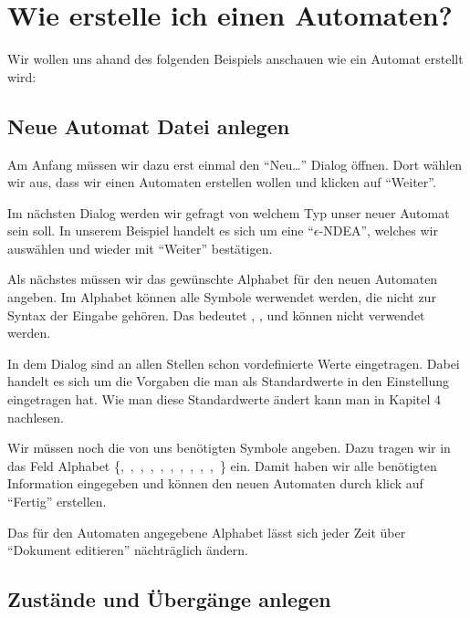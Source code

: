 \chapter{Wie erstelle ich einen Automaten?}

Wir wollen uns ahand des folgenden Beispiels anschauen wie ein Automat erstellt
wird:\vspace{10pt}

\section{Neue Automat Datei anlegen}

Am Anfang müssen wir dazu erst einmal den "`Neu\ldots"' Dialog öffnen. Dort
wählen wir aus, dass wir einen Automaten erstellen wollen und klicken
auf "`Weiter"'.\vspace{10pt}

Im nächsten Dialog werden wir gefragt von welchem Typ unser neuer
Automat sein soll. In unserem Beispiel handelt es sich um eine
"`$\epsilon$-NDEA"', welches wir auswählen und wieder mit "`Weiter"'
bestätigen.\vspace{10pt}

Als nächstes müssen wir das gewünschte Alphabet für den neuen Automaten
angeben. Im Alphabet können alle Symbole werwendet werden, die nicht zur Syntax
der Eingabe gehören. Das bedeutet \Symbol{,}, \Symbol{\{}, \Symbol{\}} und  können nicht verwendet
werden.\vspace{10pt}

In dem Dialog sind an allen Stellen schon vordefinierte Werte eingetragen.
Dabei handelt es sich um die Vorgaben die man als Standardwerte in den
Einstellung eingetragen hat. Wie man diese Standardwerte ändert kann man in Kapitel $4$ nachlesen.\vspace{10pt}

Wir müssen noch die von uns benötigten Symbole angeben. Dazu tragen wir in das
Feld Alphabet \{,\ ,\ ,\ ,\
,\ ,\ ,\ ,\ ,\ ,\
\Symbol{-}\} ein. Damit haben wir alle benötigten Information eingegeben und
können den neuen Automaten durch klick auf "`Fertig"' erstellen.\vspace{10pt}
\vspace{10pt} 

Das für den Automaten angegebene Alphabet lässt sich jeder Zeit über "`Dokument
editieren"' nächträglich ändern.

\section{Zustände und Übergänge anlegen}


